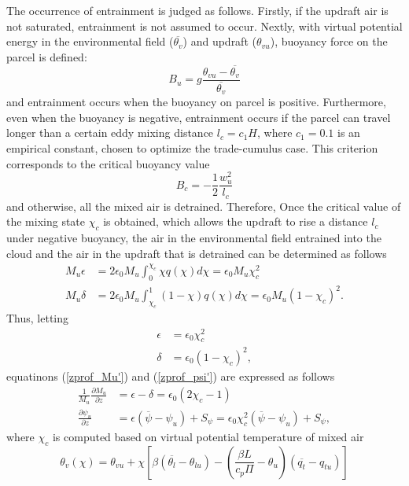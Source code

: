 The occurrence of entrainment is judged as follows. Firstly, if the updraft air is not saturated, entrainment is not assumed to occur.
Nextly, with virtual potential energy in the environmental field ($\overline{\theta_v}$) and updraft ($\theta_{vu}$), buoyancy force on the parcel is defined:
\begin{equation}\label{buoy_u}
    B_u = g\frac{\theta_{vu} - \overline{\theta_{v}}}{ \overline{\theta_v}}
\end{equation}
and entrainment occurs when the buoyancy on parcel is positive.
Furthermore, even when the buoyancy is negative, entrainment occurs if the parcel can travel longer than a certain eddy mixing distance $l_c=c_1 H$, where $c_1=0.1$ is an empirical constant, 
chosen to optimize the trade-cumulus case. This criterion corresponds to the critical buoyancy value
\begin{equation}\label{buoy_c}
    B_c = -\frac{1}{2}\frac{w_u^2}{l_c}    
\end{equation}
and otherwise, all the mixed air is detrained.
Therefore, Once the critical value of the mixing state $\chi_c$ is obtained, which allows the updraft to rise a distance $l_c$ under negative buoyancy, 
the air in the environmental field entrained into the cloud and the air in the updraft that is detrained can be determined as follows
\begin{align}
    M_u\epsilon&=2\epsilon_0 M_u\int_0^{\chi_c}\chi q(\chi) d\chi = \epsilon_0 M_u \chi_c^2 \label{flux_entre}\\
    M_u\delta&=2\epsilon_0 M_u\int_{\chi_c}^{1}(1-\chi) q(\chi) d\chi = \epsilon_0 M_u (1-\chi_c)^2. \label{flux_detre}
\end{align}
Thus, letting
\begin{align}
    \epsilon&=\epsilon_0\chi_c^2 \label{Etilde}\\
    \delta&=\epsilon_0(1-\chi_c)^2, \label{Dtilde}
\end{align}
equatinons (\ref{zprof_Mu'}) and (\ref{zprof_psi'}) are expressed as follows
\begin{align}
    \frac{1}{M_u}\frac{\partial M_u}{\partial z} &= \epsilon - \delta = \epsilon_0(2\chi_c - 1) \label{zprof_Mu_param}\\
    \frac{\partial \psi_u}{\partial z} &= \epsilon (\overline{\psi}-\psi_u) + S_{\psi} = \epsilon_0\chi_c^2(\overline{\psi}-\psi_u) + S_{\psi}, \label{zprof_psi_param}
\end{align}
where $\chi_c$ is computed based on virtual potential temperature of mixed air
\begin{equation}\label{virt_pot_t}
    \theta_v(\chi)=\theta_{vu}+\chi\left[ \beta(\overline{\theta_l}-\theta_{lu})-\left(\frac{\beta L}{c_p\Pi}-\theta_u\right)(\overline{q_t}-q_{tu})\right]   
\end{equation}
